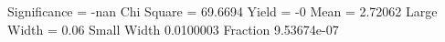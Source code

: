 Significance = -nan
Chi Square = 69.6694
Yield = -0
Mean = 2.72062
Large Width = 0.06
Small Width 0.0100003
Fraction 9.53674e-07
